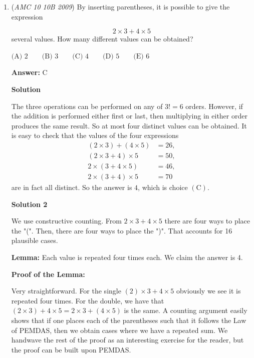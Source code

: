 \begin{enumerate}
 Note: the problem where this is linked is the second problem covered (1:20-2:30)

 


	\item (\textit{AMC 10 10B 2009}) By inserting parentheses, it is possible to give the expression

 \[2\times3 + 4\times5\]
several values.  How many different values can be obtained?


 $\text{(A) } 2 \qquad \text{(B) } 3 \qquad \text{(C) } 4 \qquad \text{(D) } 5 \qquad \text{(E) } 6$

 \textbf{Answer: }C



\textbf{Solution}

The three operations can be performed on any of $3! = 6$ orders.  However, if the addition is performed either first or last, then multiplying in either order produces the same result. So at most four distinct values can be obtained.  It is easy to check that the values of the four expressions
 \begin{align*} (2\times3) + (4\times5) &= 26,\\ (2\times3 + 4)\times5 &= 50,\\ 2\times(3 + 4\times5) &= 46,\\ 2\times(3 + 4)\times5 &= 70 \end{align*}
are in fact all distinct.  So the answer is $\boxed{4}$, which is choice $\mathrm{(C)}$.

 



\textbf{Solution 2}

We use constructive counting. From $2 \times 3 + 4 \times 5$ there are four ways to place the "(". Then, there are four ways to place the ")". That accounts for 16 plausible cases.

 \textbf{Lemma:} Each value is repeated four times each. We claim the answer is 4.

 \textbf{Proof of the Lemma:}

 Very straightforward. For the single $(2) \times 3 + 4 \times 5$ obviously we see it is repeated four times. For the double, we have that $(2 \times 3) + 4 \times 5 = 2 \times 3 + (4 \times 5)$ is the same. A counting argument easily shows that if one places each of the parentheses such that it follows the Law of PEMDAS, then we obtain cases where we have a repeated sum. We handwave the rest of the proof as an interesting exercise for the reader, but the proof can be built upon PEMDAS.


\end{enumerate}
